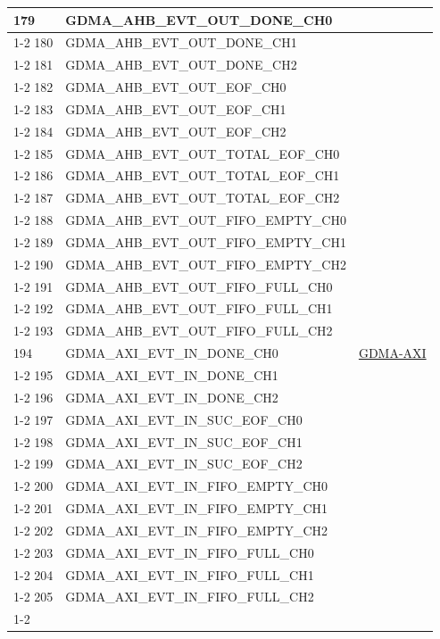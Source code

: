 \documentclass[main\_\_CN.tex]{subfiles}
\begin{document}
\begin{longtable}{ | l | l | l | }
179 & GDMA\_AHB\_EVT\_OUT\_DONE\_CH0 & \\ \cline{1-2}
180 & GDMA\_AHB\_EVT\_OUT\_DONE\_CH1 & \\ \cline{1-2}
181 & GDMA\_AHB\_EVT\_OUT\_DONE\_CH2 & \\ \cline{1-2}
182 & GDMA\_AHB\_EVT\_OUT\_EOF\_CH0  & \\ \cline{1-2}
183 & GDMA\_AHB\_EVT\_OUT\_EOF\_CH1  & \\ \cline{1-2}
184 & GDMA\_AHB\_EVT\_OUT\_EOF\_CH2  & \\ \cline{1-2}
185 & GDMA\_AHB\_EVT\_OUT\_TOTAL\_EOF\_CH0  & \\ \cline{1-2}
186 & GDMA\_AHB\_EVT\_OUT\_TOTAL\_EOF\_CH1  & \\ \cline{1-2}
187 & GDMA\_AHB\_EVT\_OUT\_TOTAL\_EOF\_CH2  & \\ \cline{1-2}
188 & GDMA\_AHB\_EVT\_OUT\_FIFO\_EMPTY\_CH0 & \\ \cline{1-2}
189 & GDMA\_AHB\_EVT\_OUT\_FIFO\_EMPTY\_CH1 & \\ \cline{1-2}
190 & GDMA\_AHB\_EVT\_OUT\_FIFO\_EMPTY\_CH2 & \\ \cline{1-2}
191 & GDMA\_AHB\_EVT\_OUT\_FIFO\_FULL\_CH0  & \\ \cline{1-2}
192 & GDMA\_AHB\_EVT\_OUT\_FIFO\_FULL\_CH1  & \\ \cline{1-2}
193 & GDMA\_AHB\_EVT\_OUT\_FIFO\_FULL\_CH2  & \\ \hline
194 & GDMA\_AXI\_EVT\_IN\_DONE\_CH0  & \hyperref[mod:dma]{GDMA-AXI} \\ \cline{1-2}
195 & GDMA\_AXI\_EVT\_IN\_DONE\_CH1  & \\ \cline{1-2}
196 & GDMA\_AXI\_EVT\_IN\_DONE\_CH2  & \\ \cline{1-2}
197 & GDMA\_AXI\_EVT\_IN\_SUC\_EOF\_CH0     & \\ \cline{1-2}
198 & GDMA\_AXI\_EVT\_IN\_SUC\_EOF\_CH1     & \\ \cline{1-2}
199 & GDMA\_AXI\_EVT\_IN\_SUC\_EOF\_CH2     & \\ \cline{1-2}
200 & GDMA\_AXI\_EVT\_IN\_FIFO\_EMPTY\_CH0  & \\ \cline{1-2}
201 & GDMA\_AXI\_EVT\_IN\_FIFO\_EMPTY\_CH1  & \\ \cline{1-2}
202 & GDMA\_AXI\_EVT\_IN\_FIFO\_EMPTY\_CH2  & \\ \cline{1-2}
203 & GDMA\_AXI\_EVT\_IN\_FIFO\_FULL\_CH0   & \\ \cline{1-2}
204 & GDMA\_AXI\_EVT\_IN\_FIFO\_FULL\_CH1   & \\ \cline{1-2}
205 & GDMA\_AXI\_EVT\_IN\_FIFO\_FULL\_CH2   & \\ \cline{1-2}

\end{longtable}
\end{document}
